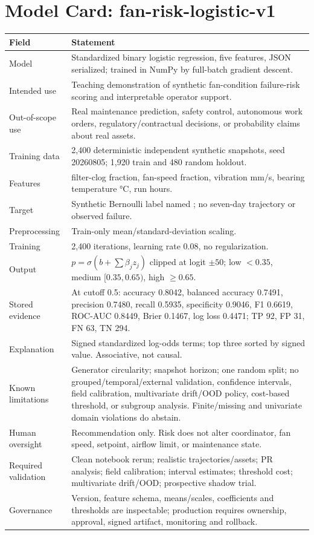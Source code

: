 \chapter{Model Card: fan-risk-logistic-v1}
\label{app:modelcard}
\begin{longtable}{L{0.24\textwidth}L{0.65\textwidth}}
\toprule
Field & Statement\\
\midrule
\endhead
Model & Standardized binary logistic regression, five features, JSON serialized; trained in NumPy by full-batch gradient descent.\\
Intended use & Teaching demonstration of synthetic fan-condition failure-risk scoring and interpretable operator support.\\
Out-of-scope use & Real maintenance prediction, safety control, autonomous work orders, regulatory/contractual decisions, or probability claims about real assets.\\
Training data & 2,400 deterministic independent synthetic snapshots, seed 20260805; 1,920 train and 480 random holdout.\\
Features & filter-clog fraction, fan-speed fraction, vibration mm/s, bearing temperature \si{\celsius}, run hours.\\
Target & Synthetic Bernoulli label named ; no seven-day trajectory or observed failure.\\
Preprocessing & Train-only mean/standard-deviation scaling.\\
Training & 2,400 iterations, learning rate 0.08, no regularization.\\
Output & $p=\sigma(b+\sum\beta_jz_j)$ clipped at logit $\pm50$; low $<0.35$, medium $[0.35,0.65)$, high $\ge0.65$.\\
Stored evidence & At cutoff 0.5: accuracy 0.8042, balanced accuracy 0.7491, precision 0.7480, recall 0.5935, specificity 0.9046, F1 0.6619, ROC-AUC 0.8449, Brier 0.1467, log loss 0.4471; TP 92, FP 31, FN 63, TN 294.\\
Explanation & Signed standardized log-odds terms; top three sorted by signed value. Associative, not causal.\\
Known limitations & Generator circularity; snapshot horizon; one random split; no grouped/temporal/external validation, confidence intervals, field calibration, multivariate drift/OOD policy, cost-based threshold, or subgroup analysis. Finite/missing and univariate domain violations do abstain.\\
Human oversight & Recommendation only. Risk does not alter coordinator, fan speed, setpoint, airflow limit, or maintenance state.\\
Required validation & Clean notebook rerun; realistic trajectories/assets; PR analysis; field calibration; interval estimates; threshold cost; multivariate drift/OOD; prospective shadow trial.\\
Governance & Version, feature schema, means/scales, coefficients and thresholds are inspectable; production requires ownership, approval, signed artifact, monitoring and rollback.\\
\bottomrule
\end{longtable}
